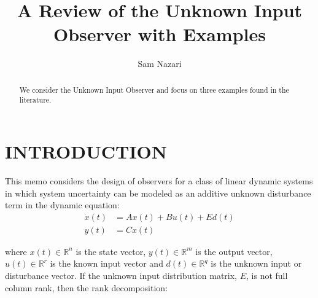 \documentclass{amsart}
\theoremstyle{definition}
\theoremstyle{remark}
\numberwithin{equation}{section}
\begin{document}
\title{A Review of the Unknown Input Observer with Examples}

\author{Sam Nazari}
\address{Department of Electrical \& Computer Engineering, Northeastern University, Boston, MA,02210}





\begin{abstract}
We consider the Unknown Input Observer and focus on three examples found in the literature.
\end{abstract}

\maketitle
\section{INTRODUCTION}
\label{sec:intro}  %

This memo considers the design of observers for a class of linear dynamic systems in which system uncertainty can be modeled as an additive unknown disturbance term in the dynamic equation:
\begin{equation}\label{eq:linSys}
\begin{aligned}
\dot{x}(t) &= Ax(t) + Bu(t) + Ed(t) \\
y(t)       &= Cx(t)
\end{aligned}
\end{equation}


\noindent where $x(t) \in \mathbb{R}^n$ is the state vector, $y(t) \in \mathbb{R}^m$ is the output vector, $u(t) \in \mathbb{R}^r$ is the known input vector and $d(t) \in \mathbb{R}^q$ is the unknown input or disturbance vector. If the unknown input distribution matrix, $E$, is not full column rank, then the rank decomposition:
\end{document}
